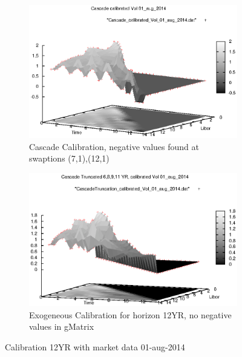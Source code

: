 \documentclass[a4paper,10pt]{article}
\begin{document}
\begin{figure}[h]
\begin{subfigure}{.5\textwidth}
  \centering
  \includegraphics[scale=0.5]{Cascade_calibrated_Vol_01_aug_2014}
  \caption{Cascade Calibration, negative values found at swaptions (7,1),(12,1)}
  \label{fig:cascade_calibration_mkt}
\end{subfigure}%
\begin{subfigure}{.5\textwidth}
  \centering
  \includegraphics[scale=0.5]{CascadeTruncation_calibrated_Vol_01_aug_2014.eps}
  \caption{Exogeneous Calibration for horizon 12YR, no negative values in gMatrix}
  \label{fig:exogeneous_cascade_calibration_mkt}
\end{subfigure}
\caption{Calibration 12YR with market data 01-aug-2014}
\label{fig:calibration_mkt}
\end{figure}
\end{document}
